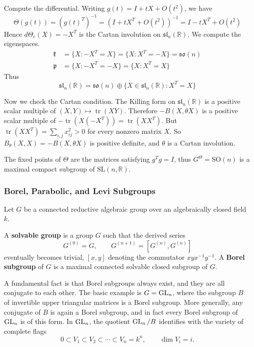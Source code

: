 \documentclass[12pt]{article}
\begin{document}
\begin{solution}
    Compute the differential. Writing
    $g(t)=I+tX+O(t^2)$,
    we have
    \[\Theta(g(t)) = (g(t)^T)^{-1} = (I+tX^T+O(t^2))^{-1} = I-tX^T+O(t^2)\]
    Hence
    $d\Theta_e(X) = -X^T$ is the Cartan involution on $\mathfrak{sl}_n(\mathbb R)$. We compute the eigenspaces. \begin{align*}
        \mathfrak k & = \{X : -X^T = X\} = \{X : X^T = -X\} = \mathfrak{so}(n) \\
        \mathfrak p & = \{X : -X^T = -X\} = \{X : X^T = X\}
    \end{align*}
    Thus
    \[\mathfrak{sl}_n(\mathbb R) = \mathfrak{so}(n) \oplus \{X \in \mathfrak{sl}_n(\mathbb R) : X^T = X\}\]

    Now we check the Cartan condition. The Killing form on $\mathfrak{sl}_n(\mathbb R)$ is a positive scalar multiple of
    $(X,Y) \mapsto \operatorname{tr}(XY)$.
    Therefore
    $-B(X,\theta X)$
    is a positive scalar multiple of
    $-\operatorname{tr}(X(-X^T)) = \operatorname{tr}(XX^T)$.
    But
    $\operatorname{tr}(XX^T) = \sum_{i,j} x_{ij}^2 > 0$
    for every nonzero matrix $X$. So $B_\theta(X,X) = -B(X,\theta X)$ is positive definite, and $\theta$ is a Cartan involution.

    The fixed points of $\Theta$ are the matrices satisfying
    $g^Tg = I$, thus $G^\Theta = \mathrm{SO}(n)$ is a maximal compact subgroup of $\mathrm{SL}(n,\mathbb R)$.
\end{solution}


\subsubsection{Borel, Parabolic, and Levi Subgroups}

Let $G$ be a connected reductive algebraic group over an algebraically closed field $k$.

\begin{definition}
    A \textbf{solvable group} is a group $G$ such that the derived series
    \[G^{(0)}=G,\qquad G^{(n+1)}=[G^{(n)},G^{(n)}]\]
    eventually becomes trivial, $[x,y]$ denoting the commutator $xy x^{-1} y^{-1}$. A \textbf{Borel subgroup} of $G$ is a maximal connected solvable closed subgroup of $G$.
\end{definition}

A fundamental fact is that Borel subgroups always exist, and they are all conjugate to each other. The basic example is $G=\operatorname{GL}_n$, where the subgroup $B$ of invertible upper triangular matrices is a Borel subgroup. More generally, any conjugate of $B$ is again a Borel subgroup, and in fact every Borel subgroup of $\operatorname{GL}_n$ is of this form. In $\operatorname{GL}_n$, the quotient $\operatorname{GL}_n/B$ identifies with the variety of complete flags
\[
    0\subset V_1\subset V_2\subset \cdots \subset V_n=k^n,
    \qquad \dim V_i=i.
\]
\end{document}
